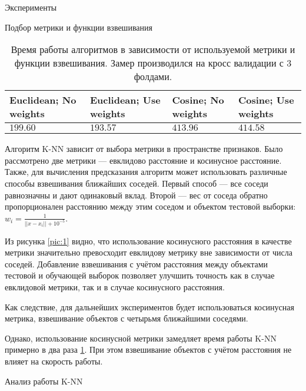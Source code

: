 \documentclass[a4paper,12pt,titlepage,finall]{article}
\begin{document}
\begin{section}{Эксперименты}
\begin{subsection}{Подбор метрики и функции взвешивания}
\begin{table}[H]
	\begin{tabular}{llll}
		Euclidean; No weights & Euclidean; Use weights & Cosine; No weights & Cosine; Use weights \\
		\hline
		$199.60$                & $193.57$                 & $413.96$             & $\bm{414.58}$             
	\end{tabular}
	\caption{Время работы алгоритмов в зависимости от используемой метрики и функции взвешивания. Замер производился на кросс валидации с 3 фолдами.}
	\label{tbl:2}
\end{table}
Алгоритм K-NN зависит от выбора метрики в пространстве признаков. Было рассмотрено две метрики --- евклидово расстояние и косинусное расстояние. Также, для вычисления предсказания алгоритм может использовать различные способы взвешивания ближайших соседей. Первый способ --- все соседи равнозначны и дают одинаковый вклад. Второй --- вес от соседа обратно пропорционален расстоянию между этим соседом и объектом тестовой выборки: $w_{i} = \frac{1}{||x - x_{i}|| + 10^{-5}}$.\par
Из рисунка \ref{pic:1} видно, что использование косинусного расстояния в качестве метрики значительно превосходит евклидову метрику вне зависимости от числа соседей. Добавление взвешивания с учётом расстояния между объектами тестовой и обучающей выборок позволяет улучшить точность как в случае евклидовой метрики, так и в случае косинусного расстояния. \par
Как следствие, для дальнейших экспериментов будет использоваться косинусная метрика, взвешивание объектов с четырьмя ближайшими соседями.\par
Однако, использование косинусной метрики замедляет время работы K-NN примерно в два раза \ref{tbl:2}. При этом взвешивание объектов с учётом расстояния не влияет на скорость работы.
\end{subsection}

\begin{subsection}{Анализ работы K-NN}


\end{subsection}
\end{section}
\end{document}
